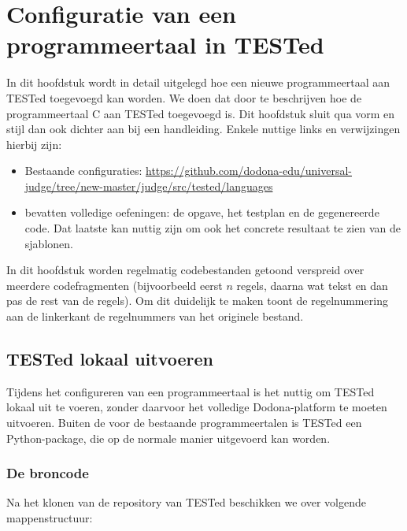 \chapter{Configuratie van een programmeertaal in TESTed}\label{ch:nieuwe-taal}

In dit hoofdstuk wordt in detail uitgelegd hoe een nieuwe programmeertaal aan TESTed toegevoegd kan worden.
We doen dat door te beschrijven hoe de programmeertaal C aan TESTed toegevoegd is.
Dit hoofdstuk sluit qua vorm en stijl dan ook dichter aan bij een handleiding.
Enkele nuttige links en verwijzingen hierbij zijn:

\begin{itemize}
    \item Bestaande configuraties: \url{https://github.com/dodona-edu/universal-judge/tree/new-master/judge/src/tested/languages}
    \item {} bevatten volledige oefeningen: de opgave, het testplan en de gegenereerde code.
    Dat laatste kan nuttig zijn om ook het concrete resultaat te zien van de sjablonen.
\end{itemize}

In dit hoofdstuk worden regelmatig codebestanden getoond verspreid over meerdere codefragmenten (bijvoorbeeld eerst $n$ regels, daarna wat tekst en dan pas de rest van de regels).
Om dit duidelijk te maken toont de regelnummering aan de linkerkant de regelnummers van het originele bestand. 

\section{TESTed lokaal uitvoeren}\label{sec:tested-lokaal-uitvoeren}

Tijdens het configureren van een programmeertaal is het nuttig om TESTed lokaal uit te voeren, zonder daarvoor het volledige Dodona-platform te moeten uitvoeren.
Buiten de  voor de bestaande programmeertalen is TESTed een Python-package, die op de normale manier uitgevoerd kan worden.

\subsection{De broncode}\label{subsec:de-broncode}

Na het klonen van de repository van TESTed beschikken we over volgende mappenstructuur:

\inputminted{text}{code/dirs-tested.txt}

